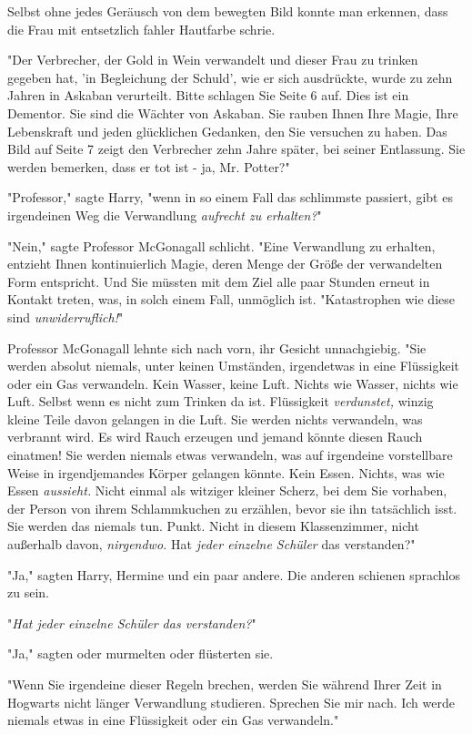 {Selbst ohne jedes Geräusch von dem bewegten Bild konnte man erkennen, dass die Frau mit entsetzlich fahler Hautfarbe schrie.

"Der Verbrecher, der Gold in Wein verwandelt und dieser Frau zu trinken gegeben hat, 'in Begleichung der Schuld', wie er sich ausdrückte, wurde zu zehn Jahren in Askaban verurteilt. Bitte schlagen Sie Seite 6 auf. Dies ist ein Dementor. Sie sind die Wächter von Askaban. Sie rauben Ihnen Ihre Magie, Ihre Lebenskraft und jeden glücklichen Gedanken, den Sie versuchen zu haben. Das Bild auf Seite 7 zeigt den Verbrecher zehn Jahre später, bei seiner Entlassung. Sie werden bemerken, dass er tot ist - ja, Mr. Potter?"

"Professor," sagte Harry, "wenn in so einem Fall das schlimmste passiert, gibt es irgendeinen Weg die Verwandlung \emph{aufrecht zu erhalten?}"

"Nein," sagte Professor McGonagall schlicht. "Eine Verwandlung zu erhalten, entzieht Ihnen kontinuierlich Magie, deren Menge der Größe der verwandelten Form entspricht. Und Sie müssten mit dem Ziel alle paar Stunden erneut in Kontakt treten, was, in solch einem Fall, unmöglich ist. "Katastrophen wie diese sind \emph{unwiderruflich!}"

Professor McGonagall lehnte sich nach vorn, ihr Gesicht unnachgiebig. "Sie werden absolut niemals, unter keinen Umständen, irgendetwas in eine Flüssigkeit oder ein Gas verwandeln. Kein Wasser, keine Luft. Nichts wie Wasser, nichts wie Luft. Selbst wenn es nicht zum Trinken da ist. Flüssigkeit \emph{verdunstet,} winzig kleine Teile davon gelangen in die Luft. Sie werden nichts verwandeln, was verbrannt wird. Es wird Rauch erzeugen und jemand könnte diesen Rauch einatmen! Sie werden niemals etwas verwandeln, was auf irgendeine vorstellbare Weise in irgendjemandes Körper gelangen könnte. Kein Essen. Nichts, was wie Essen \emph{aussieht.} Nicht einmal als witziger kleiner Scherz, bei dem Sie vorhaben, der Person von ihrem Schlammkuchen zu erzählen, bevor sie ihn tatsächlich isst. Sie werden das niemals tun. Punkt. Nicht in diesem Klassenzimmer, nicht außerhalb davon, \emph{nirgendwo.} Hat \emph{jeder einzelne Schüler} das verstanden?"

"Ja," sagten Harry, Hermine und ein paar andere. Die anderen schienen sprachlos zu sein.

"\emph{Hat jeder einzelne Schüler das verstanden?}"

"Ja," sagten oder murmelten oder flüsterten sie.

"Wenn Sie irgendeine dieser Regeln brechen, werden Sie während Ihrer Zeit in Hogwarts nicht länger Verwandlung studieren. Sprechen Sie mir nach. Ich werde niemals etwas in eine Flüssigkeit oder ein Gas verwandeln."

}
